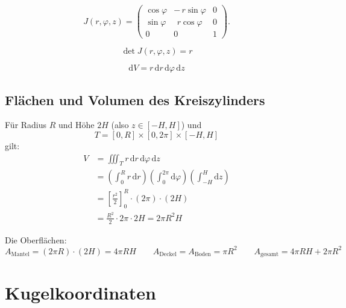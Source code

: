 \documentclass[a4paper,11pt,oneside,open=any,parskip=half, DIV=15]{scrreprt}
\begin{document}
      \[
         J(r,\varphi,z)=
         \begin{pmatrix}
            \cos\varphi & -\,r\sin\varphi & 0\\[2pt]
            \sin\varphi & \ \,r\cos\varphi & 0\\[2pt]
            0 & 0 & 1
         \end{pmatrix}.
      \]

      \begin{importantbox}
      \[
         \det J(r,\varphi,z)=r
      \]
      \end{importantbox}

      \begin{importantbox}
         \[
            \mathrm{d}V = r\,\mathrm{d}r\,\mathrm{d}\varphi\,\mathrm{d}z
         \]
      \end{importantbox}

   \subsection*{Flächen und Volumen des Kreiszylinders}
      Für Radius \(R\) und Höhe \(2H\) (also \(z\in[-H,H]\)) und
      \[
         T=[0,R]\times[0,2\pi]\times[-H,H]
      \]
      gilt:
      \begin{align*}
      V
         &= \iiint_{T} r\,\mathrm dr\,\mathrm d\varphi\,\mathrm dz \tag{Grundformel aufstellen}\\[4pt]
         &= \left(\int_{0}^{R} r\,\mathrm dr\right)
         \left(\int_{0}^{2\pi}\mathrm d\varphi\right)
         \left(\int_{-H}^{H}\mathrm dz\right) \tag{Grenzen einsetzen}\\[4pt]
         &= \left[\tfrac{r^{2}}{2}\right]_{0}^{R}\cdot (2\pi)\cdot (2H) \tag{Integrale berechnen}\\[4pt]
         &= \frac{R^{2}}{2}\cdot 2\pi \cdot 2H
         = 2\pi R^{2}H \tag{Ergebnis}
      \end{align*}

      Die Oberflächen:
      \[
         A_{\text{Mantel}}=(2\pi R)\cdot(2H)=4\pi R H\qquad
         A_{\text{Deckel}}=A_{\text{Boden}}=\pi R^{2}\qquad
         A_{\text{gesamt}}=4\pi R H+2\pi R^{2}
      \]

\section{Kugelkoordinaten}
\end{document}
